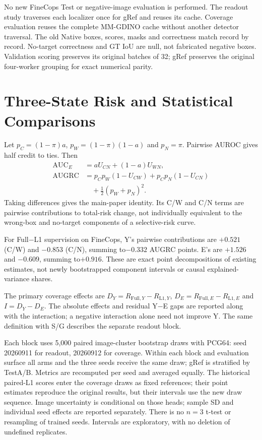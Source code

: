 \documentclass[10pt,twocolumn,letterpaper]{article}
\begin{document}
No new FineCops Test or negative-image evaluation is performed. The readout
study traverses each localizer once for gRef and reuses its cache. Coverage
evaluation reuses the complete MM-GDINO cache without another detector
traversal. The old Native boxes, scores, masks and correctness match
record by record. No-target correctness and GT IoU are null, not fabricated
negative boxes. Validation scoring preserves its original batches of 32;
gRef preserves the original four-worker grouping for exact numerical parity.

\section{Three-State Risk and Statistical Comparisons}
Let $p_C=(1-\pi)a$, $p_W=(1-\pi)(1-a)$ and $p_N=\pi$.
Pairwise AUROC gives half credit to ties. Then
\begin{align}
\mathrm{AUC}_E&=aU_{CN}+(1-a)U_{WN},\\
\mathrm{AUGRC}&=p_Cp_W(1-U_{CW})+p_Cp_N(1-U_{CN})\nonumber\\
&\quad+\tfrac12(p_W+p_N)^2.
\end{align}
Taking differences gives the main-paper identity. Its C/W and C/N terms are
pairwise contributions to total-risk change, not individually equivalent to
the wrong-box and no-target components of a selective-risk curve.

For Full$-$L1 supervision on FineCops, Y's pairwise contributions are
$+0.521$ (C/W) and $-0.853$ (C/N), summing to$-0.332$ AUGRC points.
E's are $+1.526$ and $-0.609$, summing to$+0.916$.
These are exact point decompositions of existing estimates, not newly
bootstrapped component intervals or causal explained-variance shares.

The primary coverage effects are
$D_Y=R_{\mathrm{Full},Y}-R_{\mathrm{L1},Y}$,
$D_E=R_{\mathrm{Full},E}-R_{\mathrm{L1},E}$ and $I=D_Y-D_E$.
The absolute effects and residual Y$-$E gaps are reported along with the
interaction; a negative interaction alone need not improve Y. The same
definition with S/G describes the separate readout block.

Each block uses 5,000 paired image-cluster bootstrap draws with PCG64:
seed 20260911 for readout, 20260912 for coverage. Within each block and evaluation
surface all arms and the three seeds receive the same draw; gRef is stratified
by TestA/B. Metrics are recomputed per seed and averaged equally. The
historical paired-L1 scores enter the coverage draws as fixed references;
their point estimates reproduce the original results, but their intervals
use the new draw sequence. Image uncertainty is conditional on those heads;
sample SD and individual seed effects are reported separately. There is no
$n=3$ t-test or resampling of trained seeds. Intervals are exploratory, with
no deletion of undefined replicates.
\end{document}
